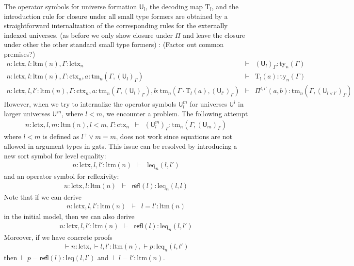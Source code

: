 \documentclass[11pt,a4paper]{article}
\theoremstyle{definition}
\newcommand{\UU}{\mathsf{U}}
\newcommand{\refl}{\mathsf{refl}}
\def\UU{\mathsf{U}}
\newcommand{\N}{\mathsf{N}}
\def\Pihat{\Pi}
\def\lctx{\mathrm{lctx}}
\def\ltm{\mathrm{ltm}}
\def\leq{\mathrm{leq}}
\newcommand{\ctx}{\mathrm{ctx}}
\newcommand{\ty}{\mathrm{ty}}
\newcommand{\tm}{\mathrm{tm}}
\def\U{\mathsf{U}}
\newcommand{\Ta}{\mathrm{T}}
\begin{document}
The operator symbols for universe formation $\UU_l$, the decoding map $\Ta_l$, and the introduction rule for closure under all small type formers are obtained by a straightforward internalization of the corresponding rules for the externally indexed universes. (as before we only show closure under $\Pi$ and leave the closure under other the other standard small type formers) : (Factor out common premises?)
\begin{eqnarray*}
n : \lctx, l : \ltm(n), \Gamma : \lctx_n &\vdash& (\U_{l})_\Gamma : \ty_n(\Gamma)\\
n : \lctx, l : \ltm(n), \Gamma : \ctx_n, a : \tm_n(\Gamma,(\U_{l})_\Gamma) &\vdash& {\Ta_{l}}(a) : \ty_n(\Gamma)\\
n : \lctx, l, l' : \ltm(n), \Gamma : \ctx_n,
a : \tm_n(\Gamma,(\U_{l})_\Gamma),
b :  \tm_n(\Gamma \cdot \Ta_{l}(a), (\U_{l'})_\Gamma)
&\vdash&
 \Pihat^{l,l'}(a,b) : \tm_n(\Gamma,(\U_{l \vee l'})_\Gamma)
\end{eqnarray*}
However, when we try to internalize the operator symbols $\UU^m_l$ for universes $\UU^l$ in larger universes $\UU^m$, where $l < m$, we encounter a problem. The following attempt
\begin{eqnarray*}
n : \lctx, l, m : \ltm(n), l < m, \Gamma : \ctx_n&\vdash&(\UU^m_l)_\Gamma: \tm_n(\Gamma,(\UU_{m})_\Gamma)
\end{eqnarray*}
where $l < m$ is defined as $l^+ \vee m = m$, does not work since equations are not allowed in argument types in gats. This issue can be resolved by introducing a new sort symbol for level equality:
\begin{eqnarray*}
n : \lctx, l, l'  : \ltm(n) &\vdash& \leq_n(l,l')
\end{eqnarray*}
and an operator symbol for reflexivity:
\begin{eqnarray*}
n : \lctx, l : \ltm(n) &\vdash& \refl(l) :  \leq_n(l,l)
\end{eqnarray*}
Note that if we can derive 
\begin{eqnarray*}
n : \lctx, l, l'  : \ltm(n) &\vdash& l = l' : \ltm(n)
\end{eqnarray*}
in the initial model, then we can also derive
\begin{eqnarray*}
n : \lctx, l,l' : \ltm(n) &\vdash& \refl(l) :  \leq_n(l,l')
\end{eqnarray*}
Moreover, if we have concrete proofs
\begin{eqnarray*}
\vdash n : \lctx, \vdash l,l' : \ltm(n), \vdash p :  \leq_n(l,l')
\end{eqnarray*}
then $\vdash p = \refl(l) : \leq(l,l')$ and $\vdash l = l' : \ltm(n)$.
\end{document}
